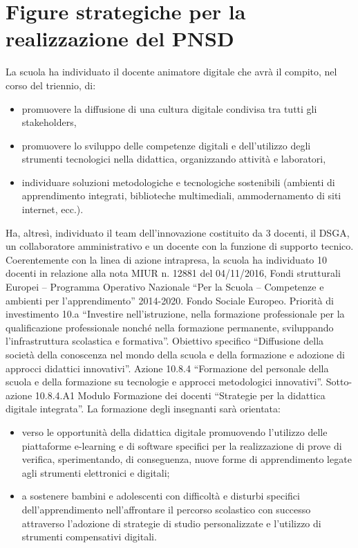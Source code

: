 \documentclass[12pt,a4paper,oneside]{memoir}
\begin{document}
\section{Figure strategiche per la realizzazione del PNSD}
La scuola ha individuato il docente animatore digitale che avrà il compito, nel corso del triennio, di:  
\begin{itemize}
\item promuovere la diffusione di una cultura digitale condivisa tra tutti gli stakeholders,
\item promuovere lo sviluppo delle competenze digitali e dell’utilizzo degli strumenti tecnologici nella didattica, organizzando attività e laboratori,
\item individuare soluzioni metodologiche e tecnologiche sostenibili (ambienti di apprendimento integrati, biblioteche multimediali, ammodernamento di siti internet, ecc.).
\end{itemize}
Ha, altresì, individuato il team dell’innovazione costituito da 3 docenti,  il DSGA,  un collaboratore amministrativo e un docente con la funzione di supporto tecnico.
Coerentemente con la linea di azione intrapresa, la scuola ha individuato 10 docenti in relazione alla nota MIUR n. 12881 del 04/11/2016, Fondi strutturali Europei – Programma Operativo Nazionale ``Per la Scuola – Competenze e ambienti per l’apprendimento'' 2014-2020. Fondo Sociale Europeo. Priorità di investimento 10.a ``Investire nell'istruzione, nella formazione professionale per la qualificazione professionale nonché nella formazione permanente, sviluppando l’infrastruttura scolastica e formativa''. Obiettivo specifico ``Diffusione della società della conoscenza nel mondo della scuola e della formazione e adozione di approcci didattici innovativi''. Azione 10.8.4 ``Formazione del personale della scuola e della formazione su tecnologie e approcci metodologici innovativi''. Sotto-azione 10.8.4.A1 Modulo Formazione dei docenti ``Strategie per la didattica digitale integrata''.
La formazione degli insegnanti sarà orientata:

\begin{itemize}
\item verso le opportunità della didattica digitale promuovendo l'utilizzo delle piattaforme e-learning e di software specifici per la realizzazione di prove di verifica, sperimentando, di conseguenza, nuove forme di apprendimento legate agli strumenti elettronici e digitali;
\item a sostenere bambini e adolescenti con difficoltà e disturbi specifici dell'apprendimento nell'affrontare il percorso scolastico con successo attraverso l'adozione di strategie di studio personalizzate e l'utilizzo di strumenti compensativi digitali.
\end{itemize}
\end{document}
